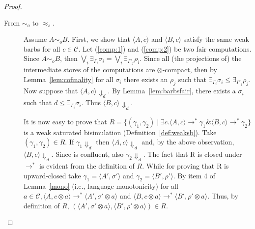 \documentclass[main.tex]{subfiles}
\begin{document}
\begin{proof}
\begin{description}
		\item[From $\sim_o$ to $\approx_{\mathit{s}}$.] Assume $A \sim_o B$. First, we show that $\langle A, c\rangle$ and $\langle B, c\rangle$ satisfy the same weak barbs  for all $c \in \mathcal{C}$. Let (\ref{comp:1}) and (\ref{comp:2}) be two fair computations. Since $A \sim_o B$, then $\bigvee_i \exists_{\Gamma_i} \sigma_i = \bigvee_i \exists_{\Gamma'_j} \rho_i$. Since all (the projections of) the intermediate stores of the computations are $\otimes$-compact,
		then by Lemma~\ref{lem:cofinality} for all $\sigma_i$ there exists an $\rho_j$ such that $\exists_{\Gamma_i} \sigma_i \leq \exists_{\Gamma'_j} \rho_j$. 
		Now suppose that $\langle A, c \rangle \Downarrow_d$. By Lemma~\ref{lem:barbsfair}, 
		there exists a $\sigma_i$ 
		such that $d \leq \exists_{\Gamma_i} \sigma_i$. Thus 
		$\langle B, c\rangle \Downarrow_d$.
		
		It is now easy to prove that
		$R = \{(\gamma_1, \gamma_2) \mid \exists c. \langle A, c \rangle \longrightarrow^* \gamma_1 \& \langle B, c\rangle \longrightarrow^* \gamma_2\}$
		is a weak saturated bisimulation (Definition~\ref{def:weaksb}). Take $(\gamma_1 , \gamma_2 ) \in R$.
		If $\gamma_1 \Downarrow_d$ then $\langle A, c\rangle \Downarrow_d$ and, by the above observation, $\langle B, c\rangle \Downarrow_d$. Since \SCCP is
		confluent, also $\gamma_2 \Downarrow_d$.
		The fact that R is closed under $\longrightarrow^*$ is evident from the definition of $R$. While
		for proving that R is upward-closed take $\gamma_1 = \langle A', \sigma'\rangle$ and $\gamma_2 = \langle B', \rho'\rangle$. By item 4 of Lemma~\ref{mono} (i.e., language monotonicity)
		for all $a \in \mathcal{C}, \langle A, c \otimes a\rangle \longrightarrow^* \langle A', \sigma' \otimes a \rangle$ and $\langle B, c \otimes a\rangle \longrightarrow^* \langle B', \rho'  \otimes a \rangle$. Thus, by definition of $R$, $(\langle A',\sigma' \otimes a \rangle, \langle B',\rho' \otimes a\rangle) \in R$.
	\end{description} 
\end{proof}
\end{document}
